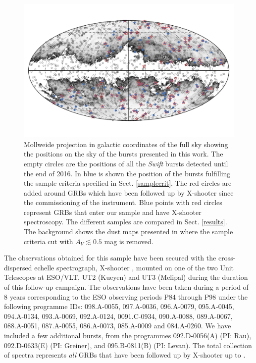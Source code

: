 \documentclass{aa}    %
\begin{document}
\begin{figure}
	\centerline{\includegraphics{figures/skymap.pdf}}
	\caption{Mollweide projection in galactic coordinates of the full sky showing
		the positions on the sky of the bursts presented in this work. The empty
		circles are the positions of all the \textit{Swift} bursts detected until the
		end of 2016. In blue is shown the position of the bursts fulfilling the sample
		criteria specified in Sect. \ref{samplecrit}. The red circles are added around
		GRBs which have been followed up by X-shooter since the commissioning of the
		instrument. Blue points with red circles represent GRBs that enter our sample
		and have X-shooter spectroscopy. The different samples are compared in Sect.
		\ref{results}. The background shows the dust maps presented in
		\citet{Schlegel1998} where the sample criteria cut with $A_V \lesssim 0.5$ mag
		is removed.}
	\label{fig:skymap}
\end{figure}



The observations obtained for this sample have been secured with the
cross-dispersed echelle spectrograph, X-shooter \citep{Vernet2011}, mounted on
one of the two Unit Telescopes at ESO/VLT, UT2 (Kueyen) and UT3 (Melipal) during
the duration of this follow-up campaign. The observations have been taken during
a period of 8 years corresponding to the ESO observing periods P84 through P98
under the following programme IDs: 098.A-0055, 097.A-0036, 096.A-0079,
095.A-0045, 094.A-0134, 093.A-0069, 092.A-0124, 0091.C-0934, 090.A-0088,
089.A-0067, 088.A-0051, 087.A-0055, 086.A-0073, 085.A-0009 and 084.A-0260. We
have included a few additional bursts, from the programmes 092.D-0056(A) (PI:
Rau), 092.D-0633(E) (PI: Greiner), and 095.B-0811(B) (PI: Levan). The total
collection of spectra represents \textit{all} GRBs that have been followed up by
X-shooter up to \termdate.
\end{document}
